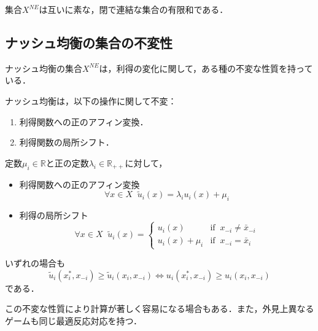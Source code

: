 \documentclass{jsreport}
\begin{document}
\begin{theo}
  集合$X^{NE}$は互いに素な，閉で連結な集合の有限和である．
\end{theo}

\subsection{ナッシュ均衡の集合の不変性}
ナッシュ均衡の集合$X^{NE}$は，利得の変化に関して，ある種の不変な性質を持っている．
\begin{screen}
  \begin{theo}
    ナッシュ均衡は，以下の操作に関して不変：
    \begin{enumerate}
      \item 利得関数への正のアフィン変換．
      \item 利得関数の局所シフト．
    \end{enumerate}
  \end{theo}
\end{screen}


定数$\mu_i \in \mathbb{R}$と正の定数$\lambda_i \in \mathbb{R}_{++}$に対して，
\begin{itemize}
  \item 利得関数への正のアフィン変換
  \begin{equation}
    \forall x \in X \; \; \tilde{u}_i(x) = \lambda_i u_i(x) + \mu_i \nonumber
  \end{equation}
  \item 利得の局所シフト
  \begin{equation}
    \forall x \in X \; \; \tilde{u}_i(x) = \begin{cases}
      u_i(x) & \mbox{if} \; \; x_{-i} \neq \bar{x}_{-i} \\
      u_i(x) + \mu_i & \mbox{if} \; \; x_{-i} = \bar{x}_i
  \end{cases}\nonumber
  \end{equation}
\end{itemize}
いずれの場合も
\begin{equation}
  \tilde{u}_i(x_i^{*}, x_{-i}) \geq \tilde{u}_i(x_i, x_{-i}) \Leftrightarrow u_i(x_i^{*}, x_{-i}) \geq u_i(x_i, x_{-i}) \nonumber
\end{equation}
である．

この不変な性質により計算が著しく容易になる場合もある．また，外見上異なるゲームも同じ最適反応対応を持つ．
\end{document}
